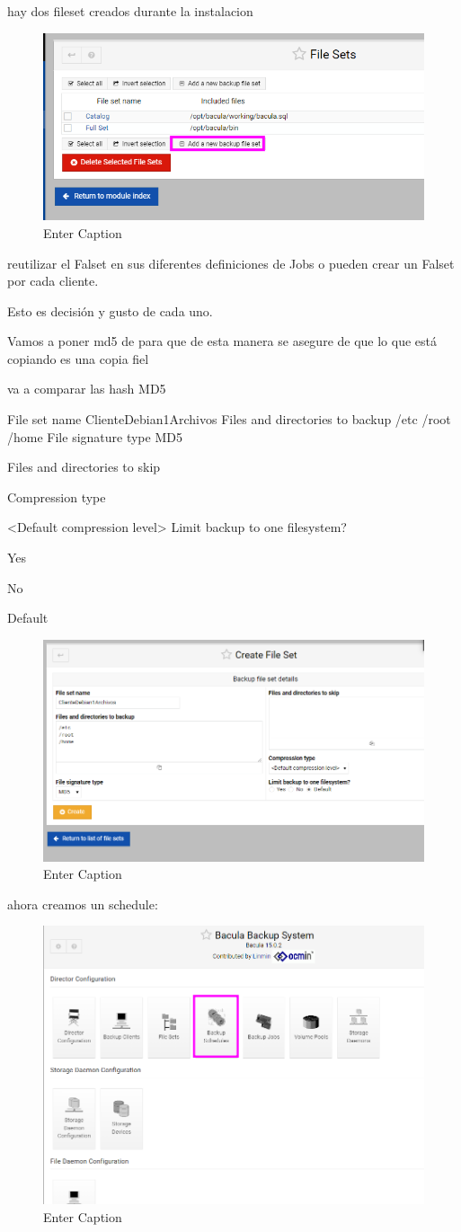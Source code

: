 hay dos fileset creados durante la instalacion

\begin{figure}[H]
    \centering
    \includegraphics[width=0.5\linewidth]{instalacionBacula/cpropiofileset.png}
    \caption{Enter Caption}
\end{figure}


 reutilizar el Falset en sus diferentes definiciones de Jobs o pueden crear un Falset por cada cliente.

Esto es decisión y gusto de cada uno.

Vamos a poner md5 de para que de esta manera se asegure de que lo que está copiando es una copia fiel

va a comparar las hash MD5 


File set name
ClienteDebian1Archivos
Files and directories to backup
/etc
/root
/home
File signature type
MD5

Files and directories to skip


Compression type

<Default compression level>
Limit backup to one filesystem?

  Yes 
 
  No 
 
  Default 


  \begin{figure}[H]
      \centering
      \includegraphics[width=0.5\linewidth]{instalacionBacula/createrfilesett.png}
      \caption{Enter Caption}
  \end{figure}


ahora creamos un schedule:
\begin{figure}[H]
    \centering
    \includegraphics[width=0.5\linewidth]{instalacionBacula/schedule.png}
    \caption{Enter Caption}
\end{figure}

